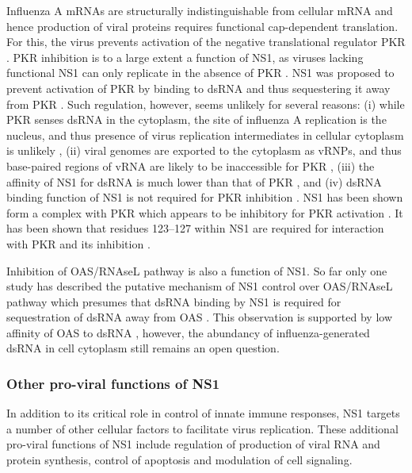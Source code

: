 		Influenza A mRNAs are structurally indistinguishable from cellular mRNA and hence production of viral proteins requires functional cap-dependent translation. For this, the virus prevents activation of the negative translational regulator \gls{PKR}  \parencite{Katze1986, Katze1988}. \gls{PKR} inhibition is to a large extent a function of \gls{NS1}, as viruses lacking functional \gls{NS1} can only replicate in the absence of \gls{PKR} \parencite{Bergmann2000a}. \gls{NS1} was proposed to prevent activation of \gls{PKR} by binding to dsRNA and thus sequestering it away from \gls{PKR} \parencite{Lu1995}. Such regulation, however, seems unlikely for several reasons: (i) while \gls{PKR} senses dsRNA in the cytoplasm, the site of influenza A replication is the nucleus, and thus presence of virus replication intermediates in cellular cytoplasm is unlikely \parencite{Jackson1982}, (ii) viral genomes are exported to the cytoplasm as \gls{vRNP}s, and thus base-paired regions of \gls{vRNA} are likely to be inaccessible for \gls{PKR} \parencite{Coloma2009}, (iii) the affinity of \gls{NS1} for dsRNA is much lower than that of \gls{PKR} \parencite{Chien2004, Husain2012}, and (iv) dsRNA binding function of \gls{NS1} is not required for \gls{PKR} inhibition \parencite{Li2006}. \gls{NS1} has been shown form a complex with \gls{PKR} which appears to be inhibitory for \gls{PKR} activation \parencite{Tan1998, Li2006}. It has been shown that residues 123--127 within \gls{NS1} are required for interaction with \gls{PKR} and its inhibition \parencite{Min2007}.	
				
		Inhibition of \gls{OAS}/\gls{RNAseL} pathway is also a function of \gls{NS1}. So far only one study has described the putative mechanism of \gls{NS1} control over \gls{OAS}/\gls{RNAseL} pathway which presumes that dsRNA binding by NS1 is required for sequestration of dsRNA away from \gls{OAS} \parencite{Min2006}. This observation is supported by low affinity of \gls{OAS} to dsRNA \parencite{Hartmann2003}, however, the abundancy of influenza-generated dsRNA in cell cytoplasm still remains an open question.
		
		\subsubsection{Other pro-viral functions of NS1}
		
		In addition to its critical role in control of innate immune responses, NS1 targets a number of other cellular factors to facilitate virus replication. These additional pro-viral functions of NS1 include regulation of production of viral RNA and protein synthesis, control of apoptosis and modulation of cell signaling.
		

